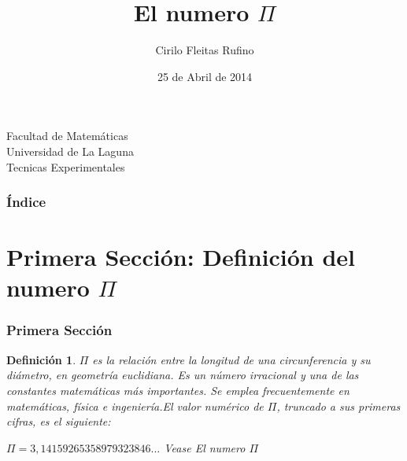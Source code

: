\documentclass{beamer}
\title[Presentación con Beamer]{El numero $\Pi$ }
\author{Cirilo Fleitas Rufino}
\date[25-04-2014]{25 de Abril de 2014}
\newtheorem{definicion}{Definición}
\begin{document}
  
\begin{frame}

  \titlepage

  \begin{small}
    \begin{center}
     Facultad de Matemáticas \\
     Universidad de La Laguna \\
     Tecnicas Experimentales
    \end{center}
  \end{small}

\end{frame}

\begin{frame}
  \frametitle{Índice}  
  \tableofcontents[pausesections]
\end{frame}


\section{Primera Sección: Definición del numero $\Pi$}



\begin{frame}

\frametitle{Primera Sección}

\begin{definicion}
$\Pi$ es la relación entre la longitud de una circunferencia y su diámetro, en geometría euclidiana. Es un número irracional y una de las constantes matemáticas más importantes. Se emplea frecuentemente en matemáticas, física e ingeniería.El valor numérico de $\Pi$, truncado a sus primeras cifras, es el siguiente:

 $\Pi = 3,14159265358979323846... $ 
    Vease \alert{El numero $\Pi$}~\cite{plan} 

\end{definicion}

\end{frame}
\end{document}
